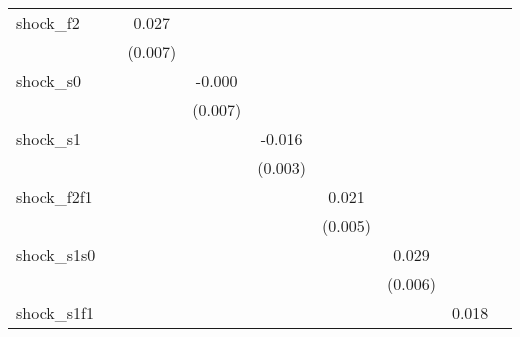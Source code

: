 {\begin{tabular}{l*{8}{c}}
\addlinespace
shock\_f2    &                     &       0.027\sym{***}&                     &                     &                     &                     &                     &                     \\
            &                     &     (0.007)         &                     &                     &                     &                     &                     &                     \\
\addlinespace
shock\_s0    &                     &                     &      -0.000         &                     &                     &                     &                     &                     \\
            &                     &                     &     (0.007)         &                     &                     &                     &                     &                     \\
\addlinespace
shock\_s1    &                     &                     &                     &      -0.016\sym{***}&                     &                     &                     &                     \\
            &                     &                     &                     &     (0.003)         &                     &                     &                     &                     \\
\addlinespace
shock\_f2f1  &                     &                     &                     &                     &       0.021\sym{***}&                     &                     &                     \\
            &                     &                     &                     &                     &     (0.005)         &                     &                     &                     \\
\addlinespace
shock\_s1s0  &                     &                     &                     &                     &                     &       0.029\sym{***}&                     &                     \\
            &                     &                     &                     &                     &                     &     (0.006)         &                     &                     \\
\addlinespace
shock\_s1f1  &                     &                     &                     &                     &                     &                     &       0.018\sym{**} &                     \\

\end{tabular}}
